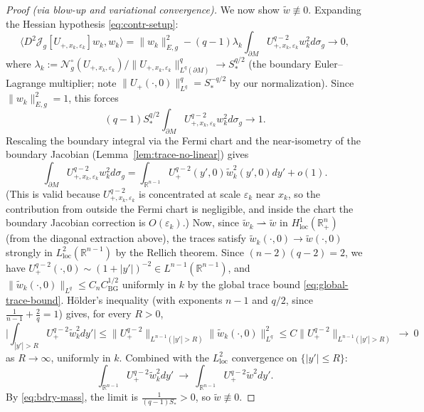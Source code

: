 \documentclass[10pt,a4paper]{amsart}
\newcommand{\R}{\mathbb{R}}
\begin{document}
\begin{proof}[Proof (via blow-up and variational convergence)]
We now show $\widetilde w\not\equiv0$.
Expanding the Hessian hypothesis \eqref{eq:contr-setup}:
\[
\big\langle D^2\mathcal J_g[U_{+,x_k,\varepsilon_k}]w_k,w_k\big\rangle
= \|w_k\|_{E,g}^2
   - (q-1)\lambda_k\int_{\partial M}U_{+,x_k,\varepsilon_k}^{q-2}w_k^2d\sigma_g
\to 0,
\]
where $\lambda_k:=\mathcal N^\circ_g(U_{+,x_k,\varepsilon_k})/\|U_{+,x_k,\varepsilon_k}\|_{L^q(\partial M)}^q\to S_\ast^{q/2}$
(the boundary Euler--Lagrange multiplier; note $\|U_+(\cdot,0)\|_{L^q}^q=S_\ast^{-q/2}$ by our normalization).
Since $\|w_k\|_{E,g}^2=1$, this forces
\begin{equation}\label{eq:bdry-mass}
(q-1)S_\ast^{q/2}\int_{\partial M}U_{+,x_k,\varepsilon_k}^{q-2}w_k^2d\sigma_g
\longrightarrow 1.
\end{equation}
Rescaling the boundary integral via the Fermi chart and
the near-isometry of the boundary Jacobian
(Lemma~\ref{lem:trace-no-linear}) gives
\[
\int_{\partial M}U_{+,x_k,\varepsilon_k}^{q-2}w_k^2d\sigma_g
=\int_{\R^{n-1}}U_+^{q-2}(y',0)
\widetilde w_k^2(y',0)dy'+o(1).
\]
(This is valid because $U_{+,x_k,\varepsilon_k}^{q-2}$
is concentrated at scale $\varepsilon_k$ near $x_k$,
so the contribution from outside the Fermi chart is negligible,
and inside the chart the boundary Jacobian correction is
$O(\varepsilon_k)$.)
Now, since $\widetilde w_k\rightharpoonup\widetilde w$ in
$H^1_{\mathrm{loc}}(\R^n_+)$ (from the diagonal extraction above), the traces satisfy
$\widetilde w_k(\cdot,0)\to\widetilde w(\cdot,0)$
strongly in $L^2_{\mathrm{loc}}(\R^{n-1})$ by the Rellich theorem.
Since $(n-2)(q-2)=2$, we have
$U_+^{q-2}(\cdot,0)\sim(1+|y'|)^{-2}\in L^{n-1}(\R^{n-1})$,
and $\|\widetilde w_k(\cdot,0)\|_{L^q}\le C_nC_{\mathrm{BG}}^{1/2}$
uniformly in $k$ by the global trace bound \eqref{eq:global-trace-bound}.
H\"older's inequality (with exponents $n-1$ and $q/2$,
since $\frac1{n-1}+\frac2q=1$) gives, for every $R>0$,
\[
\bigg|\int_{|y'|>R}U_+^{q-2}\widetilde w_k^2dy'\bigg|
\le \|U_+^{q-2}\|_{L^{n-1}(|y'|>R)}
     \|\widetilde w_k(\cdot,0)\|_{L^q}^2
\le C\|U_+^{q-2}\|_{L^{n-1}(|y'|>R)}\ \to\ 0
\]
as $R\to\infty$,
uniformly in $k$.
Combined with the $L^2_{\mathrm{loc}}$ convergence on $\{|y'|\le R\}$:
\[
\int_{\R^{n-1}}U_+^{q-2}\widetilde w_k^2dy'
\ \longrightarrow\
\int_{\R^{n-1}}U_+^{q-2}\widetilde w^2dy'.
\]
By \eqref{eq:bdry-mass}, the limit is
$\frac{1}{(q-1)S_\ast}>0$, so $\widetilde w\not\equiv0$.


\end{proof}
\end{document}
